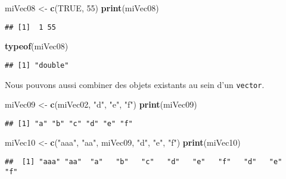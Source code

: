 \documentclass[]{book}
\newenvironment{Shaded}{\begin{snugshade}}{\end{snugshade}}
\newcommand{\KeywordTok}[1]{\textcolor[rgb]{0.13,0.29,0.53}{\textbf{#1}}}
\newcommand{\DecValTok}[1]{\textcolor[rgb]{0.00,0.00,0.81}{#1}}
\newcommand{\StringTok}[1]{\textcolor[rgb]{0.31,0.60,0.02}{#1}}
\newcommand{\OtherTok}[1]{\textcolor[rgb]{0.56,0.35,0.01}{#1}}
\newcommand{\NormalTok}[1]{#1}
\theoremstyle{definition}
\theoremstyle{definition}
\theoremstyle{definition}
\theoremstyle{remark}
\begin{document}
\begin{Shaded}
\begin{Highlighting}[]
\NormalTok{miVec08 <-}\StringTok{ }\KeywordTok{c}\NormalTok{(}\OtherTok{TRUE}\NormalTok{, }\DecValTok{55}\NormalTok{)}
\KeywordTok{print}\NormalTok{(miVec08)}
\end{Highlighting}
\end{Shaded}

\begin{verbatim}
## [1]  1 55
\end{verbatim}

\begin{Shaded}
\begin{Highlighting}[]
\KeywordTok{typeof}\NormalTok{(miVec08)}
\end{Highlighting}
\end{Shaded}

\begin{verbatim}
## [1] "double"
\end{verbatim}

Nous pouvons aussi combiner des objets existants au sein d'un
\texttt{vector}.

\begin{Shaded}
\begin{Highlighting}[]
\NormalTok{miVec09 <-}\StringTok{ }\KeywordTok{c}\NormalTok{(miVec02, }\StringTok{"d"}\NormalTok{, }\StringTok{"e"}\NormalTok{, }\StringTok{"f"}\NormalTok{)}
\KeywordTok{print}\NormalTok{(miVec09)}
\end{Highlighting}
\end{Shaded}

\begin{verbatim}
## [1] "a" "b" "c" "d" "e" "f"
\end{verbatim}

\begin{Shaded}
\begin{Highlighting}[]
\NormalTok{miVec10 <-}\StringTok{ }\KeywordTok{c}\NormalTok{(}\StringTok{"aaa"}\NormalTok{, }\StringTok{"aa"}\NormalTok{, miVec09, }\StringTok{"d"}\NormalTok{, }\StringTok{"e"}\NormalTok{, }\StringTok{"f"}\NormalTok{)}
\KeywordTok{print}\NormalTok{(miVec10)}
\end{Highlighting}
\end{Shaded}

\begin{verbatim}
##  [1] "aaa" "aa"  "a"   "b"   "c"   "d"   "e"   "f"   "d"   "e"   "f"
\end{verbatim}
\end{document}
